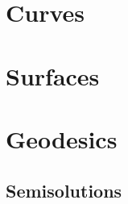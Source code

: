 \documentclass[twoside]{book}
\begin{document}







\part{Curves}



%


\part{Surfaces}


   
%


\part{Geodesics}








\appendix

\chapter{Semisolutions}

{

\small


}

{

\small\sloppy


}

{

\sloppy
\printbibliography[heading=bibintoc]
\fussy

}
\end{document}
